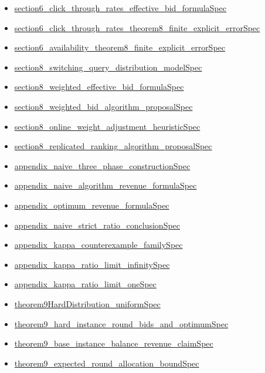 \documentclass[10pt]{article}
\begin{document}
\begin{itemize}[leftmargin=1.2em]
\begin{itemize}[leftmargin=1.2em]
\item \hyperlink{source-claim-4eaa2902ebe806c7}{section6\_click\_through\_rates\_effective\_bid\_formulaSpec}
\item \hyperlink{source-claim-ea5cc87f3aef8a1a}{section6\_click\_through\_rates\_theorem8\_finite\_explicit\_errorSpec}
\item \hyperlink{source-claim-c25fc3a95d0627bc}{section6\_availability\_theorem8\_finite\_explicit\_errorSpec}
\item \hyperlink{source-claim-8a3793465d7da5b7}{section8\_switching\_query\_distribution\_modelSpec}
\item \hyperlink{source-claim-10e7f767c2d6f40b}{section8\_weighted\_effective\_bid\_formulaSpec}
\item \hyperlink{source-claim-d3fac37f5939cc7e}{section8\_weighted\_bid\_algorithm\_proposalSpec}
\item \hyperlink{source-claim-97423e9ec14ecc23}{section8\_online\_weight\_adjustment\_heuristicSpec}
\item \hyperlink{source-claim-3800151672c640cc}{section8\_replicated\_ranking\_algorithm\_proposalSpec}
\item \hyperlink{source-claim-21680fcf9feef3df}{appendix\_naive\_three\_phase\_constructionSpec}
\item \hyperlink{source-claim-ab448c7870e0f16e}{appendix\_naive\_algorithm\_revenue\_formulaSpec}
\item \hyperlink{source-claim-e47cbf2a2f0be718}{appendix\_optimum\_revenue\_formulaSpec}
\item \hyperlink{source-claim-8d4ba93e593274ac}{appendix\_naive\_strict\_ratio\_conclusionSpec}
\item \hyperlink{source-claim-859c7b427f0b756b}{appendix\_kappa\_counterexample\_familySpec}
\item \hyperlink{source-claim-3d2d65efc7a4e85d}{appendix\_kappa\_ratio\_limit\_infinitySpec}
\item \hyperlink{source-claim-f078540b43b64d98}{appendix\_kappa\_ratio\_limit\_oneSpec}
\item \hyperlink{source-claim-1a431a6683e44bcb}{theorem9HardDistribution\_uniformSpec}
\item \hyperlink{source-claim-97c572cc7a66e662}{theorem9\_hard\_instance\_round\_bids\_and\_optimumSpec}
\item \hyperlink{source-claim-46ca155d3d47fb7a}{theorem9\_base\_instance\_balance\_revenue\_claimSpec}
\item \hyperlink{source-claim-aaab20fe03771587}{theorem9\_expected\_round\_allocation\_boundSpec}

\end{itemize}
\end{itemize}
\end{document}
